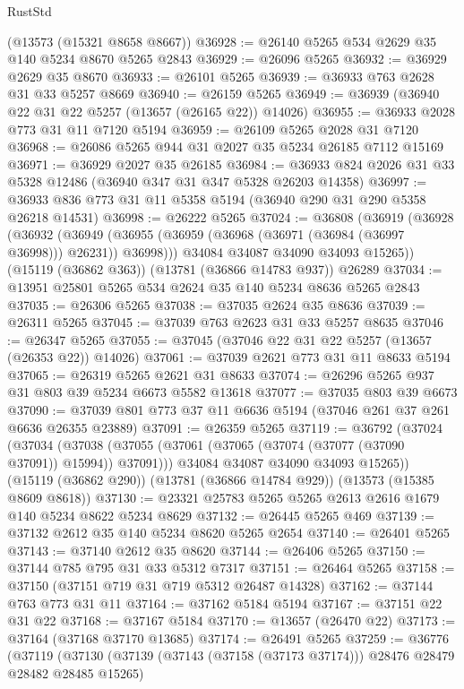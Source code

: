 \begin{lexlean}{RustStd}
\begin{coremodule}
    (@13573 (@15321 @8658 @8667))
@36928 := @26140 @5265 @534 @2629 @35 @140 @5234 @8670 @5265 @2843
@36929 := @26096 @5265
@36932 := @36929 @2629 @35 @8670
@36933 := @26101 @5265
@36939 := @36933 @763 @2628 @31 @33 @5257 @8669
@36940 := @26159 @5265
@36949 := @36939 (@36940 @22 @31 @22 @5257 (@13657 (@26165 @22)) @14026)
@36955 := @36933 @2028 @773 @31 @11 @7120 @5194
@36959 := @26109 @5265 @2028 @31 @7120
@36968 := @26086 @5265 @944 @31 @2027 @35 @5234 @26185 @7112 @15169
@36971 := @36929 @2027 @35 @26185
@36984 := @36933 @824 @2026 @31 @33 @5328 @12486 (@36940 @347 @31 @347 @5328 @26203 @14358)
@36997 := @36933 @836 @773 @31 @11 @5358 @5194 (@36940 @290 @31 @290 @5358 @26218 @14531)
@36998 := @26222 @5265
@37024 := @36808
    (@36919
      (@36928
        (@36932 (@36949 (@36955 (@36959 (@36968 (@36971 (@36984 (@36997 @36998))) @26231)) @36998)))
        @34084
        @34087
        @34090
        @34093
        @15265))
    (@15119 (@36862 @363))
    (@13781 (@36866 @14783 @937))
    @26289
@37034 := @13951 @25801 @5265 @534 @2624 @35 @140 @5234 @8636 @5265 @2843
@37035 := @26306 @5265
@37038 := @37035 @2624 @35 @8636
@37039 := @26311 @5265
@37045 := @37039 @763 @2623 @31 @33 @5257 @8635
@37046 := @26347 @5265
@37055 := @37045 (@37046 @22 @31 @22 @5257 (@13657 (@26353 @22)) @14026)
@37061 := @37039 @2621 @773 @31 @11 @8633 @5194
@37065 := @26319 @5265 @2621 @31 @8633
@37074 := @26296 @5265 @937 @31 @803 @39 @5234 @6673 @5582 @13618
@37077 := @37035 @803 @39 @6673
@37090 := @37039 @801 @773 @37 @11 @6636 @5194 (@37046 @261 @37 @261 @6636 @26355 @23889)
@37091 := @26359 @5265
@37119 := @36792
    (@37024
      (@37034
        (@37038 (@37055 (@37061 (@37065 (@37074 (@37077 (@37090 @37091)) @15994)) @37091)))
        @34084
        @34087
        @34090
        @34093
        @15265))
    (@15119 (@36862 @290))
    (@13781 (@36866 @14784 @929))
    (@13573 (@15385 @8609 @8618))
@37130 := @23321 @25783 @5265 @5265 @2613 @2616 @1679 @140 @5234 @8622 @5234 @8629
@37132 := @26445 @5265 @469
@37139 := @37132 @2612 @35 @140 @5234 @8620 @5265 @2654
@37140 := @26401 @5265
@37143 := @37140 @2612 @35 @8620
@37144 := @26406 @5265
@37150 := @37144 @785 @795 @31 @33 @5312 @7317
@37151 := @26464 @5265
@37158 := @37150 (@37151 @719 @31 @719 @5312 @26487 @14328)
@37162 := @37144 @763 @773 @31 @11
@37164 := @37162 @5184 @5194
@37167 := @37151 @22 @31 @22
@37168 := @37167 @5184
@37170 := @13657 (@26470 @22)
@37173 := @37164 (@37168 @37170 @13685)
@37174 := @26491 @5265
@37259 := @36776
    (@37119
      (@37130
        (@37139 (@37143 (@37158 (@37173 @37174))) @28476 @28479 @28482 @28485 @15265)

\end{coremodule}
\end{lexlean}
